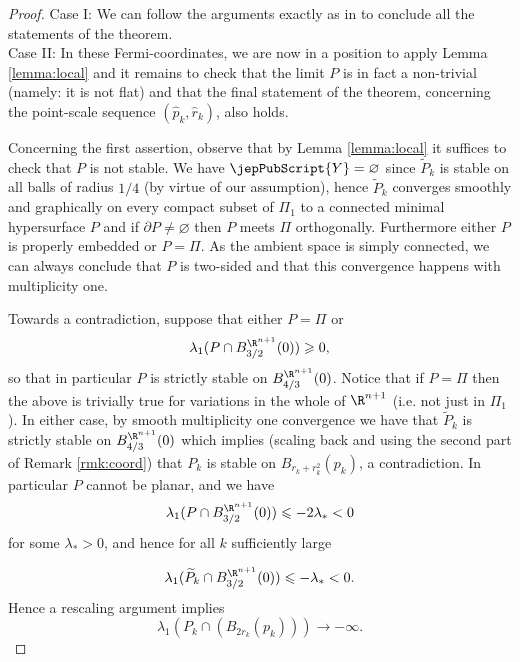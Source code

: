         	 	\begin{proof}
        	 	
        	 		Case I: We can follow the arguments exactly as in \cite[Cor.~2.6]{BS17} to conclude all the statements of the theorem. \\
        	 		
        	 		
        	 		Case II: 
        	 		In these Fermi-coordinates, we are now in a position to apply Lemma \ref{lemma:local} and it remains to check that the limit $P$ is in fact a non-trivial (namely: it is not flat) and that the final statement of the theorem, concerning the point-scale sequence $(\widehat{p}_k,\widehat{r}_k)$, also holds. 
        	 		
        	 		
        	 		Concerning the first assertion, observe that by Lemma \ref{lemma:local} it suffices to check that $P$ is not stable. 
        	 		We have ${\jepPubScript{Y}}=\varnothing$ since $\widetilde{P}_k$ is stable on all balls of radius $1/4$ (by virtue of our assumption), hence $\widetilde{P}_k$ converges smoothly and graphically on every compact subset of $\Pi_1$ to a connected minimal hypersurface $P$ and if $\partial P\neq\varnothing$ then $P$ meets $\Pi$ orthogonally. Furthermore either $P$ is properly embedded or $P=\Pi$.  
        	 		As the ambient space is simply connected, we can always conclude that $P$ is two-sided and that this convergence happens with multiplicity one.     		
        	 	
        	 	
        	 	Towards a contradiction, suppose that either $P=\Pi$ or
        	 	$$\lambda_1(P\cap B^{\R^{n+1}}_{3/2}(0))\geqslant 0,$$ so that in particular $P$ is strictly stable on $B^{\R^{n+1}}_{4/3}(0)$. Notice that if $P=\Pi$ then the above is trivially true for variations in the whole of $\R^{n+1}$ (i.e. not just in $\Pi_1$). In either case, by smooth multiplicity one convergence we have that $\widetilde{P}_k$ is strictly stable on $B^{\R^{n+1}}_{4/3}(0)$ which implies (scaling back and using the second part of Remark \ref{rmk:coord}) that $P_k$ is stable on $B_{r_k + r_k^2}(p_k)$, a contradiction. In particular $P$ cannot be planar, and we have 
        	 	$$\lambda_1(P\cap B^{\R^{n+1}}_{3/2}(0))\leqslant -2\lambda_{\ast} < 0$$ for some $\lambda_{\ast}>0$, and hence for all $k$ sufficiently large
        	 	
        	 		$$\lambda_1(\widetilde{P}_k\cap B^{\R^{n+1}}_{3/2}(0))\leqslant -\lambda_{\ast}<0.$$ 
        	 		Hence a rescaling argument implies $$\lambda_1(P_k \cap (B_{2r_k}(p_k)))\longrightarrow -\infty.$$ 
        	 		

\end{proof}

